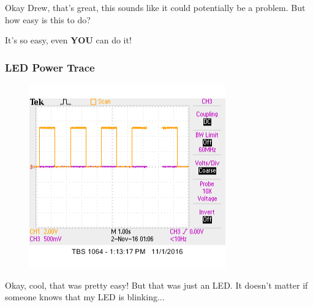 \documentclass{beamer}
\begin{document}
\begin{frame}
    \begin{center}
    Okay Drew, that's great, this sounds like it could potentially be a problem.
    But how easy is this to do?
    \end{center}
\end{frame}

\begin{frame}
    \begin{center}It's so easy, even \textbf{YOU} can do it!\end{center}
\end{frame}

\begin{frame}
\frametitle{LED Power Trace}
\begin{figure}
  \centering
    \includegraphics[width=\linewidth,height=\textheight,keepaspectratio]{images/led.png}
\end{figure}
\end{frame}

\begin{frame}
    \begin{center}
    Okay, cool, that was pretty easy!
    But that was just an LED.
    It doesn't matter if someone knows that my LED is blinking...
    \end{center}
\end{frame}
\end{document}
